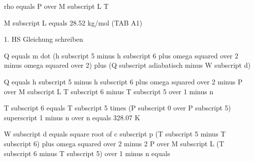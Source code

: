 rho equals P over M subscript L T

M subscript L equals 28.52 kg/mol (TAB A1)

1. HS Gleichung schreiben

Q equals m dot (h subscript 5 minus h subscript 6 plus omega squared over 2 minus omega squared over 2) plus (Q subscript adiabatisch minus W subscript d)

Q equals h subscript 5 minus h subscript 6 plus omega squared over 2 minus P over M subscript L T subscript 6 minus T subscript 5 over 1 minus n

T subscript 6 equals T subscript 5 times (P subscript 0 over P subscript 5) superscript 1 minus n over n equals 328.07 K

W subscript d equals square root of c subscript p (T subscript 5 minus T subscript 6) plus omega squared over 2 minus 2 P over M subscript L (T subscript 6 minus T subscript 5) over 1 minus n equals